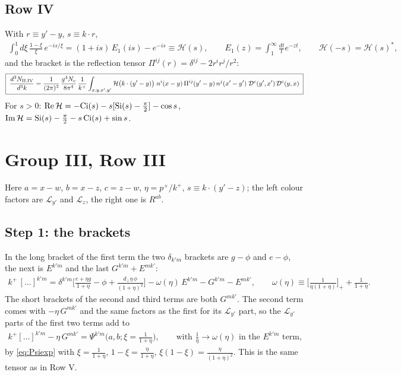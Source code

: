 \documentclass[10pt]{article}
\numberwithin{equation}{section}
\begin{document}
\subsection{Row IV}
With $r\equiv y'-y$, $s\equiv k\cdot r$,
\begin{align}
\int_{0}^{1}d\xi\,\frac{1-\xi}{\xi}\,e^{-is/\xi}=(1+is)\,E_{1}(is)-e^{-is}\equiv\mathcal{H}(s),\qquad E_{1}(z)=\int_{1}^{\infty}\frac{dt}{t}e^{-zt},\qquad\mathcal{H}(-s)=\mathcal{H}(s)^{*},
\end{align}
and the bracket is the reflection tensor $\Pi^{ij}(r)=\delta^{ij}-2r^{i}r^{j}/r^{2}$:
\begin{align}
\boxed{\;\frac{d^{3}N_{\rm II.IV}}{d^{3}k}=\frac{1}{(2\pi)^{3}}\,\frac{g^{4}N_{c}}{8\pi^{4}}\,\frac{1}{k^{+}}\int_{x,y,x',y'}\mathcal{H}\big(k\cdot(y'-y)\big)\;n^{i}(x-y)\,\Pi^{ij}(y'-y)\,n^{j}(x'-y')\;\mathcal{D}^{c}(y',x')\,\mathcal{D}^{c}(y,x)\;} \label{eq:GIIIV}
\end{align}
For $s>0$: ${\rm Re}\,\mathcal{H}=-{\rm Ci}(s)-s[{\rm Si}(s)-\frac\pi2]-\cos s$, ${\rm Im}\,\mathcal{H}={\rm Si}(s)-\frac\pi2-s\,{\rm Ci}(s)+\sin s$.

\section{Group III, Row III}

Here $a=x-w$, $b=x-z$, $c=z-w$, $\eta=p^{+}/k^{+}$, $s\equiv k\cdot(y'-z)$; the left colour factors are $\mathcal{L}_{y'}$ and $\mathcal{L}_{z}$, the right one is $R^{ab}$.

\subsection{Step 1: the brackets}
In the long bracket of the first term the two $\delta_{k'm}$ brackets are $g-\phi$ and $e-\phi$, the next is $E^{k'm}$ and the last $G^{k'm}+E^{mk'}$:
\begin{align}
k^{+}\,[\dots]^{k'm}=\delta^{k'm}\Big[\frac{e+\eta g}{1+\eta}-\phi+\frac{d_{\perp}\eta\,\phi}{(1+\eta)^{2}}\Big]-\omega(\eta)\,E^{k'm}-G^{k'm}-E^{mk'},\qquad\omega(\eta)\equiv\Big[\frac{1}{\eta(1+\eta)}\Big]_{+}+\frac{1}{1+\eta}.
\end{align}
The short brackets of the second and third terms are both $G^{mk'}$. The second term comes with $-\eta\,G^{mk'}$ and the same factors as the first for its $\mathcal{L}_{y'}$ part, so the $\mathcal{L}_{y'}$ parts of the first two terms add to
\begin{align}
k^{+}[\dots]^{k'm}-\eta\,G^{mk'}=\Psi^{k'm}\big(a,b;\xi=\tfrac{1}{1+\eta}\big),\qquad\text{with }\frac1\eta\to\omega(\eta)\text{ in the }E^{k'm}\text{ term},
\end{align}
by \eqref{eq:Psiexp} with $\xi=\frac1{1+\eta}$, $1-\xi=\frac{\eta}{1+\eta}$, $\xi(1-\xi)=\frac{\eta}{(1+\eta)^{2}}$. This is the same tensor as in Row V.
\end{document}

